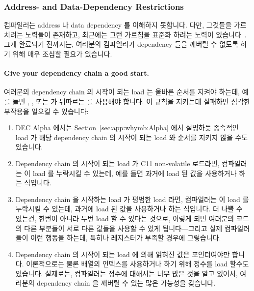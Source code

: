 \begin{enumerate}
\subsubsection{Address- and Data-Dependency Restrictions}
\label{sec:advsync:Address- and Data-Dependency Restrictions}

컴파일러는 address 나 data dependency 를 이해하지 못합니다.  다만, 그것들을
가르치려는 노력들이 존재하고, 최근에는 그런 가르침을 표준화 하려는 노력이
있습니다~\cite{PaulEMcKennneyConsumeP0190R0,PaulEMcKenney2017markconsumeP0461R1}.
그게 완료되기 전까지는, 여러분의 컴파일러가 dependency 들을 깨버릴 수 없도록
하기 위해 매우 조심할 필요가 있습니다.

\paragraph{Give your dependency chain a good start.}
여러분의 dependency chain 의 시작이 되는 load 는 올바른 순서를 지켜야 하는데,
예를 들면 , , 또는
 가 뒤따르는  를 사용해야
합니다.
이 규칙을 지키는데 실패하면 심각한 부작용을 일으킬 수 있습니다:

\begin{enumerate}
\item	DEC Alpha 에서는
	Section~\ref{sec:app:whymb:Alpha} 에서 설명하듯 종속적인 load 가 해당
	dependency chain 의 시작이 되는 load 와 순서를 지키지 않을 수도
	있습니다.
\item	Dependency chain 의 시작이 되는 load 가 C11 non-volatile
	 로드라면, 컴파일러는 이 load 를 누락시킬 수
	있는데, 예를 들면 과거에 load 된 값을 사용하거나 하는 식입니다.
\item	Dependency chain 을 시작하는 load 가 평범한 load 라면, 컴파일러는 이
	load 를 누락시킬 수 있는데, 과거에 load 된 값을 사용하거나 하는
	식입니다.
	더 나쁠 수 있는건, 한번이 아니라 두번 load 할 수 있다는 것으로, 이렇게
	되면 여러분의 코드의 다른 부분들이 서로 다른 값들을 사용할 수 있게
	됩니다---그리고 실제 컴파일러들이 이런 행동을 하는데, 특히나 레지스터가
	부족할 경우에 그렇습니다.
\item	Dependency chain 의 시작이 되는 load 에 의해 읽혀진 값은 포인터여야만
	합니다.
	이론적으로는 물론 배열의 인덱스를 사용하거나 하기 위해 정수를 load
	할수도 있습니다.
	실제로는, 컴파일러는 정수에 대해서는 너무 많은 것을 알고 있어서,
	여러분의 dependency chain 을 깨버릴 수 있는 많은 가능성을 갖습니다.
\iffalse


\end{enumerate}
\end{enumerate}

